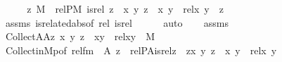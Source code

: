 \begin{isabellebody}
%
\isadelimproof
%
\endisadelimproof
%
\isatagproof
{}\isamarkupfalse%
\ {\isacharminus}{\kern0pt}\isanewline
\ \ \isamarkupfalse%
\ {\isachardoublequoteopen}z{\isasymin}\ M\ {\isasymLongrightarrow}\ relP{\isacharparenleft}{\kern0pt}{\isacharhash}{\kern0pt}{\isacharhash}{\kern0pt}M{\isacharcomma}{\kern0pt}\ is{\isacharunderscore}{\kern0pt}rel{\isacharcomma}{\kern0pt}\ z{\isacharparenright}{\kern0pt}\ {\isasymlongleftrightarrow}\ {\isacharparenleft}{\kern0pt}{\isasymexists}x\ y{\isachardot}{\kern0pt}\ z\ {\isacharequal}{\kern0pt}\ {\isasymlangle}x{\isacharcomma}{\kern0pt}\ y{\isasymrangle}\ {\isasymand}\ rel{\isacharparenleft}{\kern0pt}x{\isacharcomma}{\kern0pt}\ y{\isacharparenright}{\kern0pt}{\isacharparenright}{\kern0pt}{\isachardoublequoteclose}\ \ z\isanewline
\ \ \ \ \isamarkupfalse%
\ assms{\isacharparenleft}{\kern0pt}{}{\isacharparenright}{\kern0pt}\ is{\isacharunderscore}{\kern0pt}related{\isacharunderscore}{\kern0pt}abs{\isacharbrackleft}{\kern0pt}of\ rel\ is{\isacharunderscore}{\kern0pt}rel{\isacharbrackright}{\kern0pt}\isanewline
\ \ \ \ \isamarkupfalse%
\ auto\isanewline
\ \ \isamarkupfalse%
\ assms\isanewline
\ \ \isamarkupfalse%
\ {\isachardoublequoteopen}Collect{\isacharparenleft}{\kern0pt}A{\isasymtimes}A{\isacharcomma}{\kern0pt}{\isasymlambda}z{\isachardot}{\kern0pt}\ {\isacharparenleft}{\kern0pt}{\isasymexists}x\ y{\isachardot}{\kern0pt}\ z\ {\isacharequal}{\kern0pt}\ {\isasymlangle}x{\isacharcomma}{\kern0pt}y{\isasymrangle}\ {\isasymand}\ rel{\isacharparenleft}{\kern0pt}x{\isacharcomma}{\kern0pt}y{\isacharparenright}{\kern0pt}{\isacharparenright}{\kern0pt}{\isacharparenright}{\kern0pt}\ {\isasymin}\ M{\isachardoublequoteclose}\isanewline
\ \ \ \ \isamarkupfalse%
\ Collect{\isacharunderscore}{\kern0pt}in{\isacharunderscore}{\kern0pt}M{\isacharunderscore}{\kern0pt}{}p{\isacharbrackleft}{\kern0pt}of\ {\isachardoublequoteopen}rel{\isacharunderscore}{\kern0pt}fm{\isacharparenleft}{\kern0pt}{}{\isacharparenright}{\kern0pt}{\isachardoublequoteclose}\ {\isachardoublequoteopen}{\isasymlambda}\ A\ z\ {\isachardot}{\kern0pt}\ relP{\isacharparenleft}{\kern0pt}A{\isacharcomma}{\kern0pt}is{\isacharunderscore}{\kern0pt}rel{\isacharcomma}{\kern0pt}z{\isacharparenright}{\kern0pt}{\isachardoublequoteclose}\ {\isachardoublequoteopen}{\isasymlambda}\ z{\isachardot}{\kern0pt}{\isasymexists}x\ y{\isachardot}{\kern0pt}\ z\ {\isacharequal}{\kern0pt}\ {\isasymlangle}x{\isacharcomma}{\kern0pt}\ y{\isasymrangle}\ {\isasymand}\ rel{\isacharparenleft}{\kern0pt}x{\isacharcomma}{\kern0pt}\ y{\isacharparenright}{\kern0pt}{\isachardoublequoteclose}\ {\isacharbrackright}{\kern0pt}\isanewline

\end{isabellebody}
